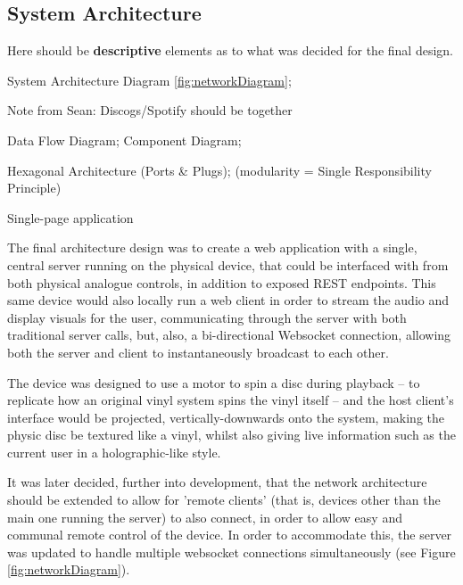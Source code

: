         \subsection{System Architecture} %
    
            \begin{temp}
                Here should be \textbf{descriptive} elements as to what was decided for the final design.
            
                System Architecture Diagram \ref{fig:networkDiagram};
                \begin{temp}Note from Sean: Discogs/Spotify should be together\end{temp}
                
                Data Flow Diagram; Component Diagram;
    
                Hexagonal Architecture (Ports \& Plugs); (modularity = Single Responsibility Principle)
    
                Single-page application
            \end{temp}
    
            The final architecture design was to create a web application with a single, central server running on the physical device, that could be interfaced with from both physical analogue controls, in addition to exposed REST endpoints. This same device would also locally run a web client in order to stream the audio and display visuals for the user, communicating through the server with both traditional server calls, but, also, a bi-directional Websocket connection, allowing both the server and client to instantaneously broadcast to each other.
    
            The device was designed to use a motor to spin a disc during playback -- to replicate how an original vinyl system spins the vinyl itself -- and the host client's interface would be projected, vertically-downwards onto the system, making the physic disc be textured like a vinyl, whilst also giving live information such as the current user in a holographic-like style.
    
            It was later decided, further into development, that the network architecture should be extended to allow for 'remote clients' (that is, devices other than the main one running the server) to also connect, in order to allow easy and communal remote control of the device. In order to accommodate this, the server was updated to handle multiple websocket connections simultaneously (see Figure \ref{fig:networkDiagram}).
        
